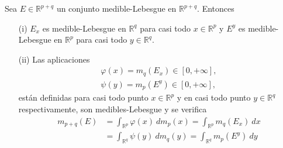 \begin{teo}
    Sea $E \in \mathbb{R}^{p+q}$ un conjunto medible-Lebesgue en $\mathbb{R}^{p+q}$. Entonces
    \begin{enumerate}
        \item[(i)] $E_x$ es medible-Lebesgue en $\mathbb{R}^{q}$ para casi todo $x \in \mathbb{R}^{p}$ y $E^y$ es medible-Lebesgue en $\mathbb{R}^{p}$ para casi todo $y \in \mathbb{R}^{q}$.
        \item[(ii)] Las aplicaciones
              \begin{align*}
                  \varphi(x) = m_q(E_x) \in [0,+\infty], \\
                  \psi(y) = m_p(E^y) \in [0,+\infty],
              \end{align*}
              están definidas para casi todo punto $x \in \mathbb{R}^{p}$ y en casi todo punto $y \in \mathbb{R}^{q}$ respectivamente, son medibles-Lebesgue y se verifica
              \begin{align*}
                  m_{p+q}(E) & = \int_{\mathbb{R}^{p}}{\varphi(x) \ dm_p(x)} = \int_{\mathbb{R}^{p}}{m_q(E_x) \ dx} \\
                             & = \int_{\mathbb{R}^{q}}{\psi(y) \ dm_q(y)} = \int_{\mathbb{R}^{q}}{m_p(E^y) \ dy}
              \end{align*}
    \end{enumerate}
\end{teo}

